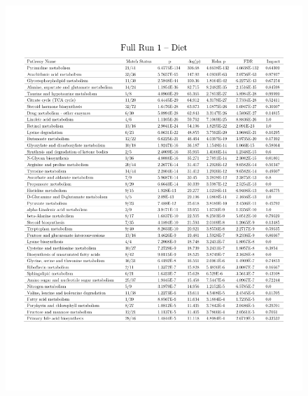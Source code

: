 \documentclass[a4paper]{book}
\begin{document}
\begin{subappendices}
\begin{figure}
	\centering
	\includegraphics[width=\linewidth]{3.Metabolomics/MSEA_charts_2.pdf}
\end{figure}


\end{subappendices}
\end{document}
